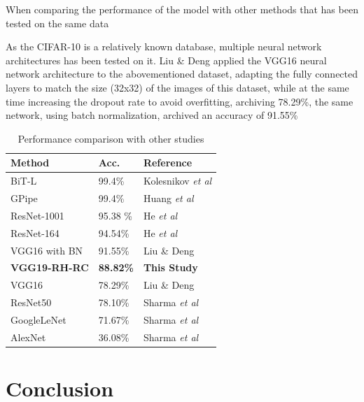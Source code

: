 \documentclass[10pt,twocolumn,letterpaper]{article}
\begin{document}
When comparing the performance of the model with other methods that has been tested on the same data

As the CIFAR-10 is a relatively known database, multiple neural network architectures has been tested on it. Liu \& Deng \cite{Liu2016} applied the VGG16 neural network architecture to the abovementioned dataset, adapting the fully connected layers to match the size (32x32) of the images of this dataset, while at the same time increasing the dropout rate to avoid overfitting, archiving 78.29\%, the same network, using batch normalization, archived an accuracy of 91.55\%



\begin{table}[h]
	\begin{center}
		\begin{tabular}{|p{3cm}|p{1.2cm}|p{2.8cm}|}
			\hline
			Method & Acc. & Reference \\
			\hline\hline
			BiT-L & 99.4\% & Kolesnikov \textit{et al} \cite{Kolesnikov2019}  \\
			GPipe & 99.4\% & Huang \textit{et al} \cite{Huang2018}  \\
			ResNet-1001  & 95.38 \% & He \textit{et al} \cite{He2016a}  \\
			ResNet-164  & 94.54\% & He \textit{et al} \cite{He2016a}  \\
			VGG16 with BN & 91.55\% & Liu \& Deng \cite{Liu2016}  \\
			\textbf{VGG19-RH-RC} & \textbf{88.82\%} &\textbf{This Study}  \\
			VGG16 & 78.29\% &  Liu \& Deng \cite{Liu2016} \\
			ResNet50 & 78.10\% &  Sharma \textit{et al} \cite{Sharma2018} \\
			GoogleLeNet & 71.67\% &  Sharma \textit{et al} \cite{Sharma2018} \\
			AlexNet & 36.08\% &  Sharma \textit{et al} \cite{Sharma2018} \\
			
			
			\hline
		\end{tabular}
	\end{center}
	\caption{Performance comparison with other studies}
	\label{table:testcomp}
\end{table}



\section{Conclusion}
\end{document}
